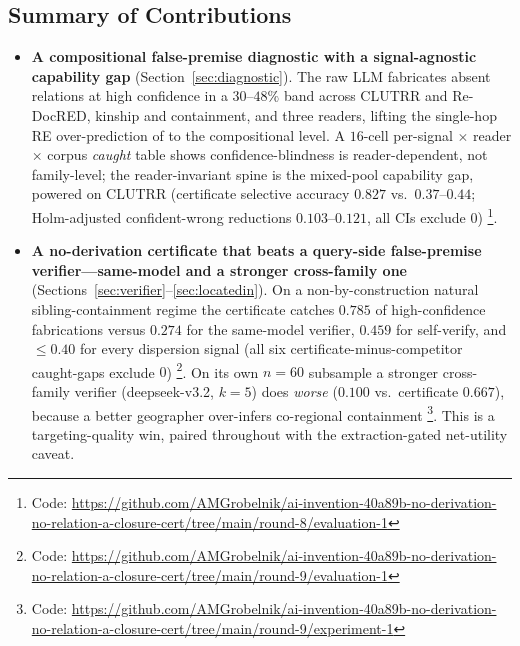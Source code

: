 \documentclass[11pt,letterpaper]{article}
\begin{document}
\subsection{Summary of Contributions}

\begin{itemize}
\item \textbf{A compositional false-premise diagnostic with a signal-agnostic capability gap} (Section~\ref{sec:diagnostic}). The raw LLM fabricates absent relations at high confidence in a $30$--$48\%$ band across CLUTRR and Re-DocRED, kinship and containment, and three readers, lifting the single-hop RE over-prediction of \citet{Yang2025DEPTH} to the compositional level. A $16$-cell per-signal $\times$ reader $\times$ corpus \emph{caught} table shows confidence-blindness is reader-dependent, not family-level; the reader-invariant spine is the mixed-pool capability gap, powered on CLUTRR (certificate selective accuracy $0.827$ vs.\ $0.37$--$0.44$; Holm-adjusted confident-wrong reductions $0.103$--$0.121$, all CIs exclude $0$) \footnote{Code: \url{https://github.com/AMGrobelnik/ai-invention-40a89b-no-derivation-no-relation-a-closure-cert/tree/main/round-8/evaluation-1}}.
\item \textbf{A no-derivation certificate that beats a query-side false-premise verifier---same-model and a stronger cross-family one} (Sections~\ref{sec:verifier}--\ref{sec:locatedin}). On a non-by-construction natural sibling-containment regime the certificate catches $0.785$ of high-confidence fabrications versus $0.274$ for the same-model verifier, $0.459$ for self-verify, and $\leq 0.40$ for every dispersion signal (all six certificate-minus-competitor caught-gaps exclude $0$) \footnote{Code: \url{https://github.com/AMGrobelnik/ai-invention-40a89b-no-derivation-no-relation-a-closure-cert/tree/main/round-9/evaluation-1}}. On its own $n{=}60$ subsample a stronger cross-family verifier (deepseek-v3.2, $k{=}5$) does \emph{worse} ($0.100$ vs.\ certificate $0.667$), because a better geographer over-infers co-regional containment \footnote{Code: \url{https://github.com/AMGrobelnik/ai-invention-40a89b-no-derivation-no-relation-a-closure-cert/tree/main/round-9/experiment-1}}. This is a targeting-quality win, paired throughout with the extraction-gated net-utility caveat.

\end{itemize}
\end{document}
